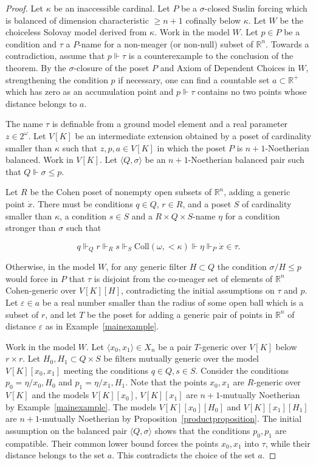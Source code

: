 \documentclass{article}
\newcommand{\gw}{\omega}
\newcommand{\gs}{\sigma}
\newcommand{\eps}{\varepsilon}
\newcommand{\coll}{\mathrm{Coll}}
\newcommand{\cantor}{2^\gw}
\theoremstyle{definition}
\begin{document}
\begin{proof}
Let $\kappa$ be an inaccessible cardinal. Let $P$ be a $\gs$-closed Suslin forcing which is balanced of dimension characteristic $\geq n+1$ cofinally below $\kappa$. Let $W$ be the choiceless Solovay model derived from $\kappa$. Work in the model $W$. Let $p\in P$ be a condition and $\tau$ a $P$-name for a non-meager (or non-null) subset of $\mathbb{R}^n$. Towards a contradiction, assume that $p\Vdash\tau$ is a counterexample to the conclusion of the theorem. By the $\gs$-closure of the poset $P$ and Axiom of Dependent Choices in $W$, strengthening the condition $p$ if necessary, one can find a countable set $a\subset\mathbb{R}^+$ which has zero as an accumulation point and $p\Vdash\tau$ contains no two points whose distance belongs to $a$.

The name $\tau$ is definable from a ground model element and a real parameter $z\in\cantor$. Let $V[K]$ be an intermediate extension obtained by a poset of cardinality smaller than $\kappa$ such that $z, p, a\in V[K]$ in which the poset $P$ is $n+1$-Noetherian balanced. Work in $V[K]$. Let $\langle Q, \gs\rangle$ be an $n+1$-Noetherian balanced pair such that $Q\Vdash\gs\leq p$.

Let $R$ be the Cohen poset of nonempty open subsets of $\mathbb{R}^n$, adding a generic point $\dot x$. There must be conditions $q\in Q$, $r\in R$, and a poset $S$ of cardinality smaller than $\kappa$, a condition $s\in S$ and a $R\times Q\times S$-name $\eta$ for a condition stronger than $\gs$ such that

$$q\Vdash_Qr\Vdash_Rs\Vdash_S\coll(\gw, <\kappa)\Vdash \eta\Vdash_P\dot x\in\tau.$$ 

\noindent Otherwise, in the model $W$, for any generic filter $H\subset Q$ the condition $\gs/H\leq p$ would force in $P$ that $\tau$ is disjoint from the co-meager set of elements of $\mathbb{R}^n$ Cohen-generic over $V[K][H]$, contradicting the initial assumptions on $\tau$ and $p$. Let $\eps\in a$ be a real number smaller than the radius of some open ball which is a subset of $r$, and let $T$ be the poset for adding a generic pair of points in $\mathbb{R}^n$ of distance $\eps$ as in Example~\ref{mainexample}.

Work in the model $W$. Let $\langle x_0, x_1\rangle\in X_n$ be a pair $T$-generic over $V[K]$ below $r\times r$. Let $H_0, H_1\subset Q\times S$ be filters mutually generic over the model $V[K][x_0, x_1]$ meeting the conditions $q\in Q, s\in S$. Consider the conditions $p_0=\eta/x_0, H_0$ and $p_1=\eta/x_1, H_1$. Note that the points $x_0, x_1$ are $R$-generic over $V[K]$ and the models $V[K][x_0]$, $V[K][x_1]$ are $n+1$-mutually Noetherian by Example~\ref{mainexample}. The models $V[K][x_0][H_0]$ and $V[K][x_1][H_1]$ are $n+1$-mutually Noetherian by Proposition~\ref{productproposition}. The initial assumption on the balanced pair $\langle Q, \gs\rangle$ shows that the conditions $p_0, p_1$ are compatible. Their common lower bound forces the points $x_0, x_1$ into $\tau$, while their distance belongs to the set $a$. This contradicts the choice of the set $a$.
\end{proof}
\end{document}

